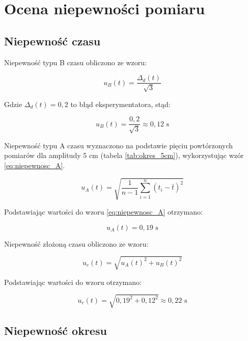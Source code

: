 \documentclass[a4paper,12pt]{article}
\begin{document}
\section{Ocena niepewności pomiaru}

\subsection{Niepewność czasu}

Niepewność typu B czasu obliczono ze wzoru:

\begin{equation*}
    u_B(t) = \frac{\Delta_d(t)}{\sqrt{3}}
\end{equation*}

Gdzie $\Delta_d(t) = 0,2$ to błąd eksperymentatora, stąd:

\begin{equation*}
    u_B(t) = \frac{0,2}{\sqrt{3}} \approx 0,12 \text{ s}
\end{equation*}

Niepewność typu A czasu wyznaczono na podstawie pięciu powtórzonych pomiarów dla amplitudy 5 cm (tabela \ref{tab:okres_5cm}), wykorzystując wzór \ref{eq:niepewnosc_A}.

\begin{equation} \label{eq:niepewnosc_A}
    u_A(t) = \sqrt{\frac{1}{n-1} \sum_{i=1}^{n} (t_i - \bar{t})^2}
\end{equation}

Podstawiając wartości do wzoru \ref{eq:niepewnosc_A} otrzymano:

\begin{equation*}
    u_A(t) = 0,19 \text{ s}
\end{equation*}

Niepewność złożoną czasu obliczono ze wzoru:

\begin{equation*}
    u_c(t) = \sqrt{u_A(t)^2 + u_B(t)^2}
\end{equation*}

Podstawiając wartości do wzoru otrzymano:

\begin{equation*}
    u_c(t) = \sqrt{0,19^2 + 0,12^2} \approx 0,22 \text{ s}
\end{equation*}





\subsection{Niepewność okresu}
\end{document}
